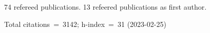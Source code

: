 74 refereed publications. 13 refeered publications as first author.

Total citations~=~3142; h-index~=~31 (2023-02-25)